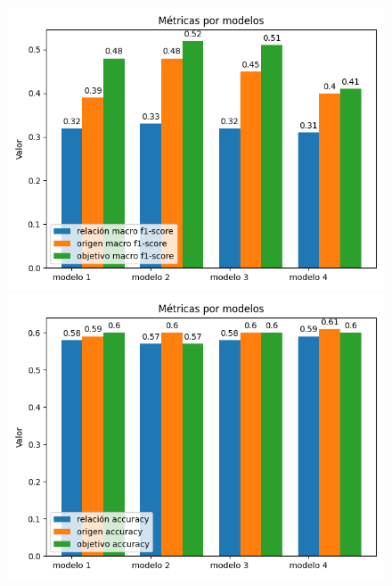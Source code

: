 \begin{figure}[h!]
	\begin{center}
		\includegraphics[scale=.4]{Graphics/persuasive_essays_all_linked_all_relation_f1_scores.png}
		\includegraphics[scale=.4]{Graphics/persuasive_essays_all_linked_all_relation_accuracy.png}\\
	\end{center}
	\begin{center}

\end{center}
\end{figure}

